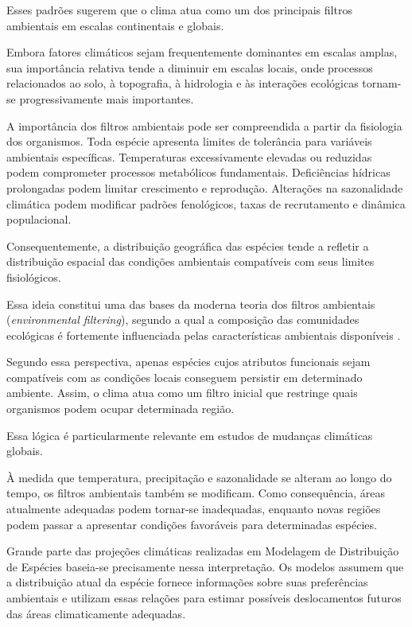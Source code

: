 Esses padrões sugerem que o clima atua como um dos principais filtros ambientais em escalas continentais e globais.

\begin{atencao}
	Embora fatores climáticos sejam frequentemente dominantes em escalas amplas, sua importância relativa tende a diminuir em escalas locais, onde processos relacionados ao solo, à topografia, à hidrologia e às interações ecológicas tornam-se progressivamente mais importantes.
\end{atencao}

A importância dos filtros ambientais pode ser compreendida a partir da fisiologia dos organismos. Toda espécie apresenta limites de tolerância para variáveis ambientais específicas. Temperaturas excessivamente elevadas ou reduzidas podem comprometer processos metabólicos fundamentais. Deficiências hídricas prolongadas podem limitar crescimento e reprodução. Alterações na sazonalidade climática podem modificar padrões fenológicos, taxas de recrutamento e dinâmica populacional.

Consequentemente, a distribuição geográfica das espécies tende a refletir a distribuição espacial das condições ambientais compatíveis com seus limites fisiológicos.

Essa ideia constitui uma das bases da moderna teoria dos filtros ambientais (\textit{environmental filtering}), segundo a qual a composição das comunidades ecológicas é fortemente influenciada pelas características ambientais disponíveis \parencite{keddy1992,weiher1998,cornwell2006}.

Segundo essa perspectiva, apenas espécies cujos atributos funcionais sejam compatíveis com as condições locais conseguem persistir em determinado ambiente. Assim, o clima atua como um filtro inicial que restringe quais organismos podem ocupar determinada região.

Essa lógica é particularmente relevante em estudos de mudanças climáticas globais.

À medida que temperatura, precipitação e sazonalidade se alteram ao longo do tempo, os filtros ambientais também se modificam. Como consequência, áreas atualmente adequadas podem tornar-se inadequadas, enquanto novas regiões podem passar a apresentar condições favoráveis para determinadas espécies.

Grande parte das projeções climáticas realizadas em Modelagem de Distribuição de Espécies baseia-se precisamente nessa interpretação. Os modelos assumem que a distribuição atual da espécie fornece informações sobre suas preferências ambientais e utilizam essas relações para estimar possíveis deslocamentos futuros das áreas climaticamente adequadas.


